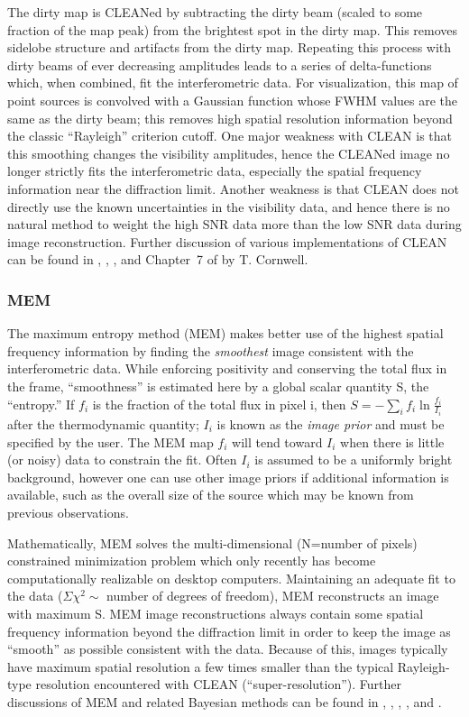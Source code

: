 \documentclass[12pt]{iopart}
\begin{document}
The dirty map is CLEANed by subtracting the dirty beam (scaled to
some fraction of the map peak) from the brightest spot in the dirty
map.  This removes sidelobe structure and artifacts from the dirty
map.  Repeating this process with dirty beams of ever decreasing
amplitudes leads to a series of delta-functions which, when combined,
fit the interferometric data.  For visualization, this map of point
sources is convolved with a Gaussian function whose FWHM values are
the same as the dirty beam; this removes high spatial resolution
information beyond the classic ``Rayleigh'' criterion cutoff.
One major weakness with CLEAN is that this smoothing changes
the visibility amplitudes, hence the CLEANed image no longer
strictly fits the interferometric data, especially the
spatial frequency information near the diffraction limit.
Another weakness is that CLEAN does not
directly use the known uncertainties
in the visibility data, and hence there is no natural method to
weight the high SNR data more than the low SNR data during image
reconstruction.  Further discussion of various
implementations of CLEAN can be found in \cite{clark80}, \cite{schwab84}, 
\cite{cornwell83}, and Chapter~7 of \cite{nrao86} by T. Cornwell.

\subsubsection{MEM}
\label{monnier_mem}
The maximum entropy method (MEM) makes better use of the highest
spatial frequency information by finding the {\em
smoothest} image consistent with the interferometric data.  While
enforcing positivity and conserving the total flux in the frame,
``smoothness'' is estimated here by a global scalar quantity S, the
``entropy.''  If $f_i$ is the fraction of the total flux in pixel i,
then $S=-\sum_{i} f_i \ln \frac{f_i}{I_i}$ after the thermodynamic quantity;
$I_i$ is known as the {\em image prior} and must be specified by the user.
The MEM map $f_i$ will tend toward $I_i$ when there is
little (or noisy) data to constrain the fit.  Often $I_i$ is assumed to
be a uniformly bright background, however one can use other image priors if
additional information is available, such as
the overall size of the source which may be known from previous observations.

Mathematically, MEM solves the multi-dimensional (N=number of
pixels) constrained minimization problem which only
recently has become computationally realizable on desktop computers.
Maintaining an adequate fit to the data ($\Sigma\chi^2 \sim$ number of
degrees of freedom), MEM reconstructs an image with maximum S.  MEM
image reconstructions always contain some spatial frequency
information beyond the diffraction limit in order to keep the image
as ``smooth'' as possible consistent with the data.
Because of this, images typically have maximum spatial resolution a few times
smaller than the typical Rayleigh-type resolution encountered with CLEAN
 (``super-resolution'').
Further discussions of MEM and related Bayesian methods can be found in
\cite{pp92}, \cite{nn86},
\cite{sb84}, \cite{mem83}, and \cite{sivia87}.
\end{document}
